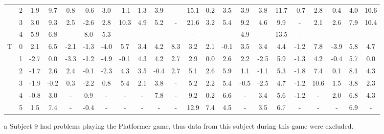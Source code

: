 \begin{landscape}
\begin{table*}
\begin{threeparttable}
{\begin{tabular}{cccccccccccccccccccccc}
                      & 2   & 1.9  & 9.7  & 0.8  & -0.6 & 3.0   & -1.1 & 1.3  & 3.9  & -\tnote{a}   & 15.1 & 0.2   & 3.5    & 3.9  & 3.8  & 11.7 & -0.7 & 2.8  & 0.4  & 4.0  & 10.6 \\
                      & 3   & 3.0  & 9.3  & 2.5  & -2.6 & 2.8   & 10.3 & 4.9  & 5.2  & -\tnote{a}   & 21.6 & 3.2   & 5.4    & 9.2  & 4.6  & 9.9  & -    & 2.1  & 2.6  & 7.9  & 10.4 \\
                      & 4   & 5.9  & 6.8  & -    & 8.0  & 5.3   & -    & -    & -    & -\tnote{a}   & -    & -     & -      & 4.9  & -    & 13.5 & -    & -    & -    & -    & -     \\
\hline
\multirow{6}{*}{T}    & 0   & 2.1  & 6.5  & -2.1 & -1.3 & -4.0  & 5.7  & 3.4  & 4.2  & 8.3  & 3.2  & 2.1   & -0.1  & 3.5  & 3.4  & 4.4  & -1.2 & 7.8  & -3.9 & 5.8  & 4.7  \\
                      & 1   & -2.7 & 0.0  & -3.3 & -1.2 & -4.9  & -0.1 & 4.3  & 4.2  & 2.7  & 2.9  & 0.0   & 2.6   & 2.2  & -2.5 & 5.9  & -1.3 & 4.2  & -0.4 & 5.7  & 0.0 \\
                      & 2   & -1.7 & 2.6  & 2.4  & -0.1 & -2.3  & 4.3  & 3.5  & -0.4 & 2.7  & 5.1  & 2.6   & 5.9   & 1.1  & -1.1 & 5.3  & -1.8 & 7.4  & 0.1  & 8.1  & 4.3  \\
                      & 3   & -1.9 & -0.2 & 0.3  & -2.2 & 0.8   & 5.4  & 2.1  & 3.8  & -    & 5.2  & 2.2   & 5.4   & -0.5 & -2.5 & 4.7  & -1.2 & 10.6 & 1.5  & 3.8  & 2.3  \\
                      & 4   & -0.8 & 3.0  & -    & 0.9  & -     & -    & -    & 7.8  & -    & 9.2  & 0.2   & 6.6   & -    & 3.4  & 5.6  & -1.2 & -    & 2.0  & 6.8  & 4.3  \\
                      & 5   & 1.5  & 7.4  & -    & -0.4 & -     & -    & -    & -    & -    & 12.9 & 7.4   & 4.5   & -    & 3.5  & 6.7  & -    & -    & -    & 6.9  & -    \\
\bottomrule
\end{tabular}
}
\begin{tablenotes}
\small
\item[a]{Subject 9 had problems playing the Platformer game, thus data from this subject during this game were excluded.}
\end{tablenotes}
\end{threeparttable}
\end{table*}
\end{landscape}

